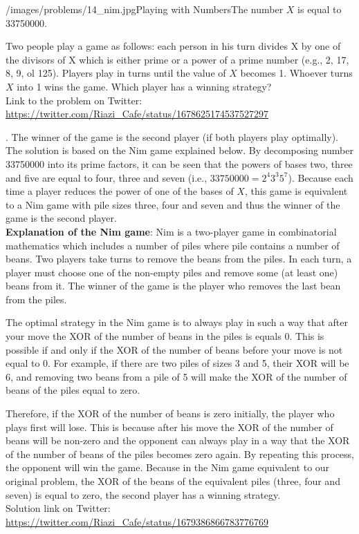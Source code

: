 \begin{problem}{/images/problems/14_nim.jpg}{Playing with Numbers}The number $X$ is equal to 33750000.

Two people play a game as follows: each person in his turn divides X by one of the divisors of X which is either prime or a power of a prime number (e.g., 2, 17, 8, 9, ol 125). Players play in turns until the value of $X$ becomes 1. Whoever turns $X$ into 1 wins the game. Which player has a winning strategy? \\[0.2cm]

Link to the problem on Twitter:  \url{https://twitter.com/Riazi_Cafe/status/1678625174537527297}\end{problem}
\begin{solution}.
	The winner of the game is the second player (if both players play optimally).\\[0.2cm]
	
	The solution is based on the Nim game explained below. By decomposing  number 33750000 into its prime factors, it can be seen that the powers of bases two, three and five are equal to four, three and seven (i.e., $33750000 = 2^4 3^3 5^7$). Because each time a player reduces the power of one of the bases of $X$, this game is equivalent to a Nim game with pile sizes  three, four and seven and thus the winner of the game is the second player.\\[0.2cm]
	
	\textbf{Explanation of the Nim game}: Nim is a two-player game in combinatorial mathematics which includes a number of piles where pile contains a number of beans. Two players take turns to remove the beans from the piles. In each turn, a player must choose one of the non-empty piles and remove some (at least one) beans from it. The winner of the game is the player who removes the last bean from the piles.
	
	The optimal strategy in the Nim game is to always play in such a way that after your move the XOR of the number of beans in the piles is equals 0. This is possible if  and only if the XOR of the number of beans before your move is not equal to 0. For example, if there are two piles of sizes 3 and 5, their XOR will be 6, and removing two beans from a pile of 5 will make the XOR of the number of beans of the piles equal to zero.
	
	Therefore, if the XOR of the number of beans is zero initially, the player who plays first will lose. This is because after his move the XOR of the number of beans will be non-zero and the opponent can always play in a way that the XOR of the number of beans of the piles becomes zero again. By repeating this process, the opponent will win the game. Because in the Nim game equivalent to our original problem, the XOR of the beans of the equivalent piles (three, four and seven) is equal to zero,  the second player has a winning strategy.\\[0.2cm]
	
	
	Solution link on Twitter:  \url{https://twitter.com/Riazi_Cafe/status/1679386866783776769}\end{solution}
